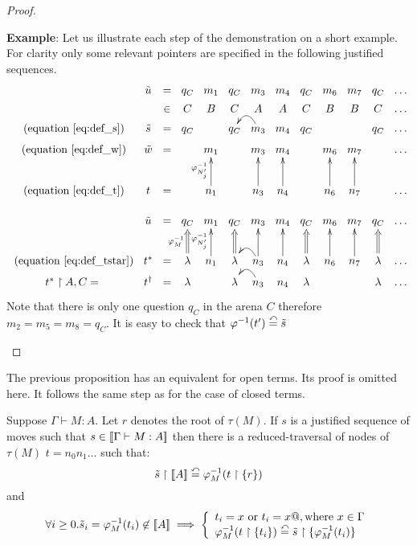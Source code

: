 \begin{proof}
\begin{itemize}
    \textbf{Example}: Let us illustrate each step of the demonstration on a short example.
        For clarity only some relevant pointers are specified in the following justified sequences.
    $$
    \xymatrix @=3pt{
        & \tilde{u} &=& q_C & m_1 & q_C & m_3 & m_4 & q_C & m_6 & m_7 & q_C & \ldots \\
        & &\in& C & B & C & A & A & C & B & B & C & \ldots \\
        \mbox{ (equation \ref{eq:def_s})} & \tilde{s} &=& q_C & & q_C & m_3  \ar@/_1pc/[l] & m_4 & q_C &  & & q_C & \ldots \\
        \mbox{ (equation \ref{eq:def_w})} & \tilde{w}  &=&  & m_1 &  & m_3 & m_4 &  & m_6 & m_7 &  & \ldots  \\ \\ \\
        \mbox{ (equation \ref{eq:def_t})} & t &=&  & n_1\ar[uuu]^{\varphi^{-1}_{N'_j}} &  & n_3 \ar[uuu] & n_4\ar[uuu] & & n_6\ar[uuu] & n_7\ar[uuu] &  & \ldots \\ \\
        & \tilde{u}  &=& q_C & m_1 & q_C & m_3 & m_4 & q_C & m_6 & m_7 & q_C & \ldots  \\ \\ \\
        \mbox{ (equation \ref{eq:def_tstar})} & t^\ast &=& \lambda \ar@{=>}[uuu]^{\varphi^{-1}_{M}} & n_1\ar[uuu]^{\varphi^{-1}_{N'_j}} & \lambda\ar@{=>}[uuu] & n_3 \ar[uuu] \ar@/_1pc/[l] & n_4\ar[uuu] & \lambda\ar@{=>}[uuu] & n_6\ar[uuu] & n_7\ar[uuu] & \lambda\ar@{=>}[uuu] & \ldots \\
        t^\ast\upharpoonright A,C =& t^\dagger &=& \lambda &  & \lambda & n_3\ar@/_1pc/[l] & n_4 & \lambda & &  & \lambda & \ldots \\
        }
    $$
    Note that there is only one question $q_C$ in the arena $C$ therefore $m_2 = m_5 = m_8 = q_C$.
    It is easy to check that $\varphi^{-1}(t') \stackrel{\curvearrowleft}{=} \tilde{s}$
\end{itemize}
\end{proof}

The previous proposition has an equivalent for open terms. Its proof is omitted here. It
follows the same step as for the case of closed terms.
\begin{prop}
\label{prop:rel_gamesem_redtrav_opened}
Suppose $\Gamma \vdash M : A$. Let $r$ denotes the root of $\tau(M)$. If $s$ is a justified sequence of moves such
that $s \in {[\![\Gamma \vdash M:A ]\!]}$ then there is a reduced-traversal of nodes of $\tau(M)$
$t = n_0 n_1 \ldots$ such that:
 $$\tilde{s} \upharpoonright {[\![A ]\!]} \stackrel{\curvearrowleft}{=}  \varphi^{-1}_M (t \upharpoonright \{r \})$$
and
$$\forall i \geq 0 . \tilde{s}_i = \varphi^{-1}_M(t_i) \not \in {[\![A ]\!]}
\implies \left\{
        \begin{array}{ll}
            t_i = x \mbox{ or } t_i = x@, \hbox{where } x \in \Gamma \\
            \varphi^{-1}_M(t \upharpoonright \{t_i\}) \stackrel{\curvearrowleft}{=} \tilde{s} \upharpoonright \{ \varphi^{-1}_M(t_i) \}
        \end{array}
        \right.
$$
\end{prop}


